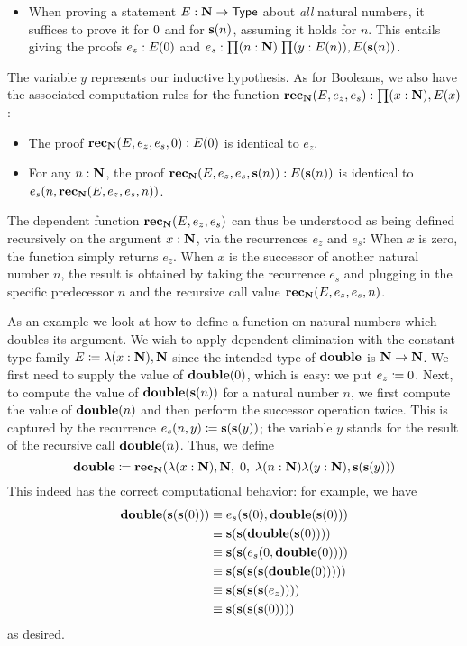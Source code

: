 \begin{itemize}
\item When proving a statement $E : \mathbf{N} \to \mathsf{Type}$ about \emph{all} natural numbers, it suffices to prove it for $0$ and for $\mathbf{s}(n)$, assuming it holds
for $n$. This entails giving the proofs $e_z : E(0)$ and $e_s : \prd{n : \nat}{y : E(n)} E(\s(n))$.
\end{itemize}
The variable $y$ represents our inductive hypothesis. As for Booleans, we also have the associated computation rules for the function $\rec_\nat(E,e_z,e_s) : \prd{x:\nat} E(x)$:
\begin{itemize}
\item The proof $\mathbf{rec}_\mathbf{N}(E,e_z,e_s,0) : E(0)$ is identical to $e_z$.
\item For any $n : \mathbf{N}$, the proof $\mathbf{rec}_\mathbf{N}(E,e_z,e_s,\mathbf{s}(n)) : E(\mathbf{s}(n))$ is identical to $e_s(n,\mathbf{rec}_\mathbf{N}(E,e_z,e_s,n))$.
\end{itemize}
The dependent function $\mathbf{rec}_\mathbf{N}(E,e_z,e_s)$ can thus be understood as being defined recursively on the argument $x : \mathbf{N}$, via the recurrences $e_z$ and $e_s$: When $x$ is zero, the function simply returns $e_z$. When $x$ is the successor of another natural number $n$, the result is obtained by taking the recurrence $e_s$ and plugging in the specific predecessor $n$ and the recursive call value $\mathbf{rec}_\mathbf{N}(E,e_z,e_s,n)$.

As an example we look at how to define a function on natural numbers which doubles its argument. We wish to apply dependent elimination with the constant type family $E \coloneqq \lambda(x : \mathbf{N}), \mathbf{N}$ since the intended type of $\mathbf{double}$ is $\mathbf{N} \to \mathbf{N}$. We first need to supply the value of $\mathbf{double}(0)$, which is easy: we put $e_z \coloneqq 0$. Next, to compute the value of $\mathbf{double}(\mathbf{s}(n))$ for a natural number $n$, we first compute the value of $\mathbf{double}(n)$ and then perform the successor operation twice. This is captured by the recurrence $e_s(n,y) \coloneqq \mathbf{s}(\mathbf{s}(y))$; the variable $y$ stands for the result of the recursive call $\mathbf{double}(n)$. Thus, we define
\[ \mathbf{double} \coloneqq \mathbf{rec}_\mathbf{N}(\lambda(x :\mathbf{N}), \mathbf{N}, \;  0, \;  \lambda(n: \mathbf{N}) \lambda (y:\mathbf{N}), \mathbf{s}(\mathbf{s}(y))) \]
This indeed has the correct computational behavior: for example, we have 
\begin{align*}
\mathbf{double}(\mathbf{s}(\mathbf{s}(0))) & \equiv e_s(\mathbf{s}(0), \mathbf{double}(\mathbf{s}(0))) \\
                 & \equiv \mathbf{s}(\mathbf{s}(\mathbf{double}(\mathbf{s}(0)))) \\
                 & \equiv \mathbf{s}(\mathbf{s}(e_s(0,\mathbf{double}(0)))) \\
                 & \equiv \mathbf{s}(\mathbf{s}(\mathbf{s}(\mathbf{s}(\mathbf{double}(0))))) \\
                 & \equiv \mathbf{s}(\mathbf{s}(\mathbf{s}(\mathbf{s}(e_z)))) \\
                 & \equiv \mathbf{s}(\mathbf{s}(\mathbf{s}(\mathbf{s}(0))))
\end{align*}
as desired.

